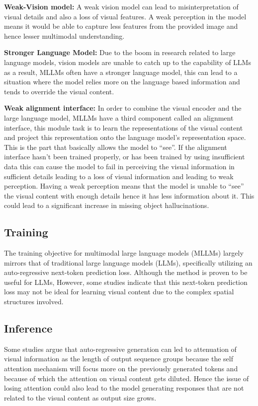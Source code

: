 \documentclass[twocolumn, 9pt]{extarticle}
\begin{document}
\textbf{Weak-Vision model:} A weak vision model can lead to misinterpretation of visual details and also a loss of visual features. A weak perception in the model means it would be able to capture less features from the provided image and hence lesser multimodal understanding. 

\textbf{Stronger Language Model:} Due to the boom in research related to large language models, vision models are unable to catch up to the capability of LLMs as a result, MLLMs often have a stronger language model, this can lead to a situation where the model relies more on the language based information and tends to override the visual content. 

\textbf{Weak alignment interface:} In order to combine the visual encoder and the large language model, MLLMs have a third component called an alignment interface, this module task is to learn the representations of the visual content and project this representation onto the language model’s representation space. This is the part that basically allows the model to “see”.  If the alignment interface hasn’t been trained properly, or has been trained by using insufficient data this can cause the model to fail in perceiving the visual information in sufficient details leading to a loss of visual information and leading to weak perception. Having a weak perception means that the model is unable to “see” the visual content with enough details hence it has less information about it. This could lead to a significant increase in missing object hallucinations. 

\subsection{Training}
The training objective for multimodal large language models (MLLMs) largely mirrors that of traditional large language models (LLMs), specifically utilizing an auto-regressive next-token prediction loss. Although the method is proven to be useful for LLMs, However, some studies indicate that this next-token prediction loss may not be ideal for learning visual content due to the complex spatial structures involved.

\subsection{Inference}
Some studies argue that auto-regressive generation can led to attenuation of visual information as the length of output sequence groups because the self attention mechanism will focus more on the previously generated tokens and because of which the attention on visual content gets diluted. Hence the issue of losing attention could also lead to the model generating responses that are not related to the visual content as output size grows.
\end{document}
